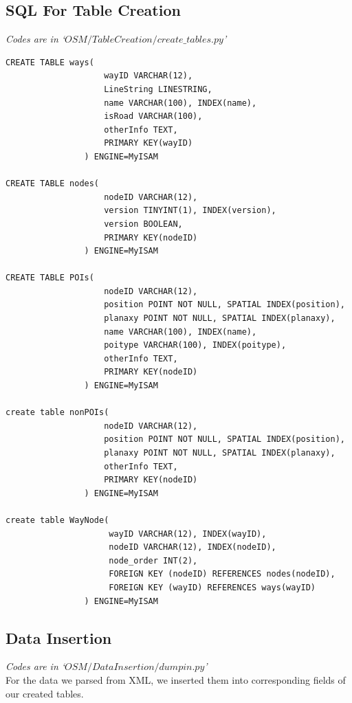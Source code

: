 \documentclass[final,1p,times]{elsarticle}
\begin{document}
\subsection{SQL For Table Creation}
\emph{Codes are in `$OSM/TableCreation/create\_tables.py$'}
\begin{verbatim}
CREATE TABLE ways(
          			wayID VARCHAR(12),
                    LineString LINESTRING,
                    name VARCHAR(100), INDEX(name),
                    isRoad VARCHAR(100),
                    otherInfo TEXT,
                    PRIMARY KEY(wayID)
                ) ENGINE=MyISAM
                
CREATE TABLE nodes(
                    nodeID VARCHAR(12),
                    version TINYINT(1), INDEX(version),
                    version BOOLEAN,
                    PRIMARY KEY(nodeID)
                ) ENGINE=MyISAM
                
CREATE TABLE POIs(
                    nodeID VARCHAR(12),
                    position POINT NOT NULL, SPATIAL INDEX(position),
                    planaxy POINT NOT NULL, SPATIAL INDEX(planaxy),
                    name VARCHAR(100), INDEX(name),
                    poitype VARCHAR(100), INDEX(poitype),
                    otherInfo TEXT,
                    PRIMARY KEY(nodeID)
                ) ENGINE=MyISAM
                
create table nonPOIs(
                    nodeID VARCHAR(12),
                    position POINT NOT NULL, SPATIAL INDEX(position),
                    planaxy POINT NOT NULL, SPATIAL INDEX(planaxy),
                    otherInfo TEXT,
                    PRIMARY KEY(nodeID)
                ) ENGINE=MyISAM
                
create table WayNode(
                     wayID VARCHAR(12), INDEX(wayID),
                     nodeID VARCHAR(12), INDEX(nodeID),
                     node_order INT(2),
                     FOREIGN KEY (nodeID) REFERENCES nodes(nodeID),
                     FOREIGN KEY (wayID) REFERENCES ways(wayID)
                ) ENGINE=MyISAM                
\end{verbatim}

\subsection{Data Insertion}
\emph{Codes are in `$OSM/DataInsertion/dumpin.py$'}\\

For the data we parsed from XML, we inserted them into corresponding fields of our created tables.
\end{document}
